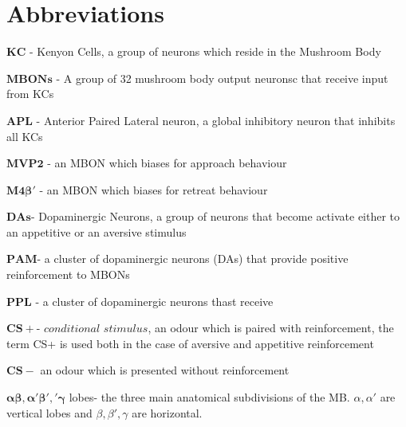 
\section*{Abbreviations}

\begin{minipage}[t]{1\columnwidth}%
$\mathbf{KC}$ - Kenyon Cells, a group of neurons which reside in
the Mushroom Body

$\mathbf{MBONs}$ - A group of 32 mushroom body output neuronsc that
receive input from KCs

$\mathbf{APL}$ - Anterior Paired Lateral neuron, a global inhibitory
neuron that inhibits all KCs

$\mathbf{MVP2}$ - an MBON which biases for approach behaviour

$\mathbf{M4\beta'}$ - an MBON which biases for retreat behaviour

$\mathbf{DAs}$- Dopaminergic Neurons, a group of neurons that become
activate either to an appetitive or an aversive stimulus 

$\mathbf{PAM}$- a cluster of dopaminergic neurons (DAs) that provide
positive reinforcement to MBONs

$\mathbf{PPL}$ - a cluster of dopaminergic neurons thast receive 

$\mathbf{CS+}$- $conditional$ $stimulus$, an odour which is paired
with reinforcement, the term CS+ is used both in the case of aversive
and appetitive reinforcement

$\mathbf{CS-}$ an odour which is presented without reinforcement

$\mathbf{\alpha\beta,\alpha'\beta','\gamma}$ lobes- the three main
anatomical subdivisions of the MB. $\alpha,\alpha'$ are vertical
lobes and $\beta,\beta',\gamma$ are horizontal. %
\end{minipage}
